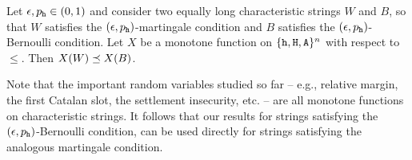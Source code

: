    

  \begin{lemma}\label{lemma:dominance-martingale}
    Let $\epsilon, p_{\mathtt{h}} \in (0,1)$ and consider 
    two equally long characteristic strings $W$ and $B$, 
    so that $W$ satisfies the $(\epsilon, p_{\mathtt{h}})$-martingale condition 
    and $B$ satisfies the $(\epsilon, p_{\mathtt{h}})$-Bernoulli condition. 
    Let $X$ be a monotone function on $\{\mathtt{h}, \mathtt{H}, \mathtt{A}\}^n$ with respect to $\leq$. 
    Then $X(W) \preceq X(B)$.
  \end{lemma}

  Note that the important random variables studied so far -- e.g., 
  relative margin, the first Catalan slot, the settlement insecurity, etc. -- are 
  all monotone functions on characteristic strings. 
  It follows that our results for strings satisfying the $(\epsilon, p_{\mathtt{h}})$-Bernoulli condition, 
  can be used directly for strings satisfying the analogous martingale condition.


